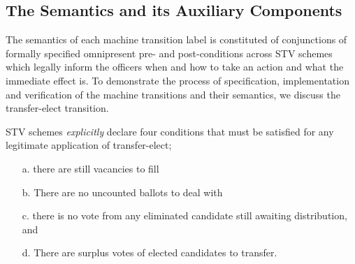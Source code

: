 \documentclass[10pt,conference]{IEEEtran}
\begin{document}
\subsection{The Semantics and its Auxiliary Components}
\label{sec:MachineSem}


The semantics of each machine transition label is constituted of conjunctions of formally specified  omnipresent pre- and post-conditions across STV schemes which legally inform the officers when and how to take an action and what the immediate effect is. To demonstrate the process of specification, implementation and verification of the machine transitions and their semantics, we discuss the transfer-elect transition.


STV schemes \emph{explicitly} declare four conditions that must be satisfied  for any legitimate application of transfer-elect; 
\begin{itemize}
\item[a.] there are still vacancies to fill
\item[b.] There are no uncounted ballots to deal with
\item[c.] there is no vote from any eliminated candidate still awaiting distribution, and
\item[d.] There are surplus votes of elected candidates to  transfer.
\end{itemize}
\end{document}
